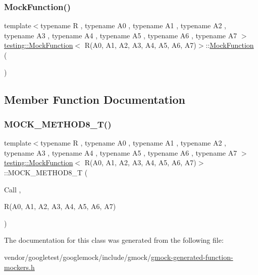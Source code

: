 \subsubsection{\texorpdfstring{Mock\+Function()}{MockFunction()}}
{\footnotesize\ttfamily template$<$typename R , typename A0 , typename A1 , typename A2 , typename A3 , typename A4 , typename A5 , typename A6 , typename A7 $>$ \\
\hyperlink{classtesting_1_1_mock_function}{testing\+::\+Mock\+Function}$<$ R(A0, A1, A2, A3, A4, A5, A6, A7)$>$\+::\hyperlink{classtesting_1_1_mock_function}{Mock\+Function} (\begin{DoxyParamCaption}{ }\end{DoxyParamCaption})\hspace{0.3cm}{\ttfamily [inline]}}



\subsection{Member Function Documentation}
\mbox{\label{classtesting_1_1_mock_function_3_01_r_07_a0_00_01_a1_00_01_a2_00_01_a3_00_01_a4_00_01_a5_00_01_a6_00_01_a7_08_4_a895c470e00e07294ab42c09588ae1e4c}} 
\subsubsection{\texorpdfstring{M\+O\+C\+K\+\_\+\+M\+E\+T\+H\+O\+D8\+\_\+\+T()}{MOCK\_METHOD8\_T()}}
{\footnotesize\ttfamily template$<$typename R , typename A0 , typename A1 , typename A2 , typename A3 , typename A4 , typename A5 , typename A6 , typename A7 $>$ \\
\hyperlink{classtesting_1_1_mock_function}{testing\+::\+Mock\+Function}$<$ R(A0, A1, A2, A3, A4, A5, A6, A7)$>$\+::M\+O\+C\+K\+\_\+\+M\+E\+T\+H\+O\+D8\+\_\+T (\begin{DoxyParamCaption}\item[{Call}]{,  }\item[{R(A0, A1, A2, A3, A4, A5, A6, A7)}]{ }\end{DoxyParamCaption})}



The documentation for this class was generated from the following file\+:\begin{DoxyCompactItemize}
\item 
vendor/googletest/googlemock/include/gmock/\hyperlink{gmock-generated-function-mockers_8h}{gmock-\/generated-\/function-\/mockers.\+h}\end{DoxyCompactItemize}
